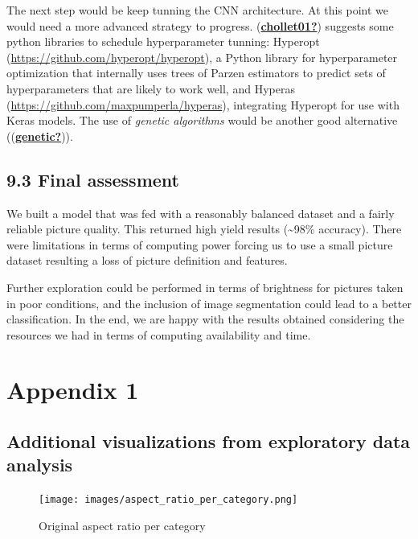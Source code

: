 \documentclass[
  11pt,
]{article}
\begin{document}
The next step would be keep tunning the CNN architecture. At this point
we would need a more advanced strategy to progress.
(\protect\hyperlink{ref-chollet01}{\textbf{chollet01?}}) suggests some
python libraries to schedule hyperparameter tunning: Hyperopt
(\url{https://github.com/hyperopt/hyperopt}), a Python library for
hyperparameter optimization that internally uses trees of Parzen
estimators to predict sets of hyperparameters that are likely to work
well, and Hyperas (\url{https://github.com/maxpumperla/hyperas}),
integrating Hyperopt for use with Keras models. The use of \emph{genetic
algorithms} would be another good alternative
((\protect\hyperlink{ref-genetic}{\textbf{genetic?}})).

\hypertarget{final-assessment}{%
\subsection{9.3 Final assessment}\label{final-assessment}}

We built a model that was fed with a reasonably balanced dataset and a
fairly reliable picture quality. This returned high yield results
(\textasciitilde98\% accuracy). There were limitations in terms of
computing power forcing us to use a small picture dataset resulting a
loss of picture definition and features.

Further exploration could be performed in terms of brightness for
pictures taken in poor conditions, and the inclusion of image
segmentation could lead to a better classification. In the end, we are
happy with the results obtained considering the resources we had in
terms of computing availability and time.

\pagebreak

\hypertarget{appendix-1}{%
\section{Appendix 1}\label{appendix-1}}

\hypertarget{additional-visualizations-from-exploratory-data-analysis}{%
\subsection{Additional visualizations from exploratory data
analysis}\label{additional-visualizations-from-exploratory-data-analysis}}

\begin{figure}
\centering
\texttt{[image: images/aspect\_ratio\_per\_category.png]}
\caption{Original aspect ratio per category}
\end{figure}
\end{document}
